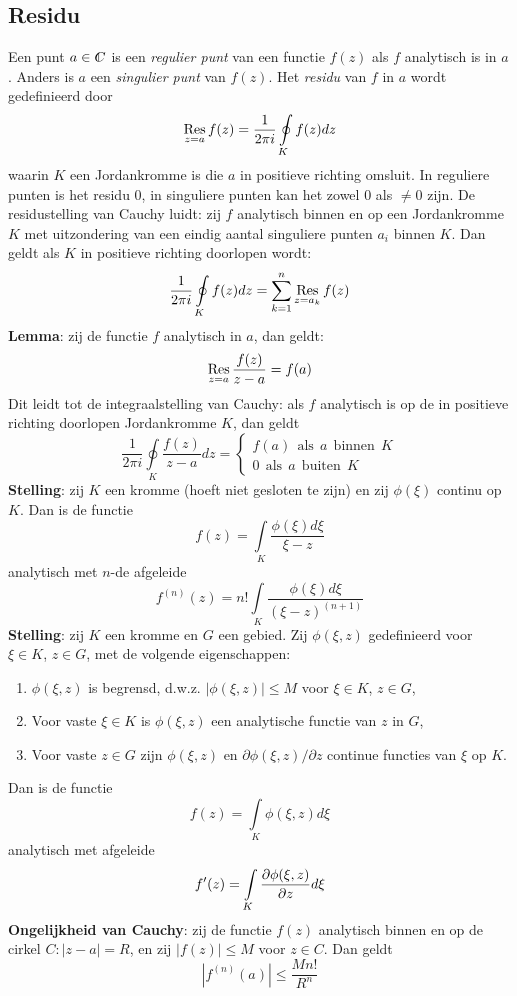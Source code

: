\subsection{Residu}
Een punt $a\in\CC$ is een {\it regulier punt} van een functie $f(z)$ als $f$
analytisch is in $a$. Anders is $a$ een {\it singulier punt} van $f(z)$. Het
{\it residu} van $f$ in $a$ wordt gedefinieerd door
\[
\mathop{\rm Res}\limits_{z=a}f(z)=\frac{1}{2\pi i}\oint\limits_Kf(z)dz
\]
waarin $K$ een Jordankromme is die $a$ in positieve richting omsluit. In
reguliere punten is het residu 0, in singuliere punten kan het zowel 0 als
$\neq0$ zijn. De residustelling van Cauchy luidt: zij $f$ analytisch binnen en
op een Jordankromme $K$ met uitzondering van een eindig aantal singuliere
punten $a_i$ binnen $K$. Dan geldt als $K$ in positieve richting doorlopen
wordt:
\[
\frac{1}{2\pi i}\oint\limits_Kf(z)dz=\sum_{k=1}^n\mathop{\rm Res}\limits_{z=a_k}f(z)
\]
{\bf Lemma}: zij de functie $f$ analytisch in $a$, dan geldt:
\[
\mathop{\rm Res}\limits_{z=a}\frac{f(z)}{z-a}=f(a)
\]
Dit leidt tot de integraalstelling van Cauchy: als $f$ analytisch is op de in
positieve richting doorlopen Jordankromme $K$, dan geldt
\[
\frac{1}{2\pi i}\oint\limits_K\frac{f(z)}{z-a}dz=\left\{\begin{array}{l}
f(a)~~\mbox{als}~~a~~\mbox{binnen}~~K\\
0~~\mbox{als}~~a~~\mbox{buiten}~~K
\end{array}\right.
\]
{\bf Stelling}: zij $K$ een kromme (hoeft niet gesloten te zijn) en zij
$\phi(\xi)$ continu op $K$. Dan is de functie
\[
f(z)=\int\limits_K\frac{\phi(\xi)d\xi}{\xi-z}
\]
analytisch met $n$-de afgeleide
\[
f^{(n)}(z)=n!\int\limits_K\frac{\phi(\xi)d\xi}{(\xi-z)^{(n+1)}}
\]
{\bf Stelling}: zij $K$ een kromme en $G$ een gebied. Zij $\phi(\xi,z)$
gedefinieerd voor $\xi\in K$, $z\in G$, met de volgende eigenschappen:
\begin{enumerate}
\item $\phi(\xi,z)$ is begrensd, d.w.z. $|\phi(\xi,z)|\leq M$ voor $\xi\in K$, $z\in G$,
\item Voor vaste $\xi\in K$ is $\phi(\xi,z)$ een analytische functie van $z$ in $G$,
\item Voor vaste $z\in G$ zijn $\phi(\xi,z)$ en $\partial\phi(\xi,z)/\partial z$
      continue functies van $\xi$ op $K$.
\end{enumerate}
Dan is de functie
\[
f(z)=\int\limits_K\phi(\xi,z)d\xi
\]
analytisch met afgeleide
\[
f'(z)=\int\limits_K\frac{\partial \phi(\xi,z)}{\partial z}d\xi
\]
{\bf Ongelijkheid van Cauchy}: zij de functie $f(z)$ analytisch binnen en op de
cirkel $C:|z-a|=R$, en zij $|f(z)|\leq M$ voor $z\in C$. Dan geldt
\[
\left|f^{(n)}(a)\right|\leq\frac{Mn!}{R^n}
\]

